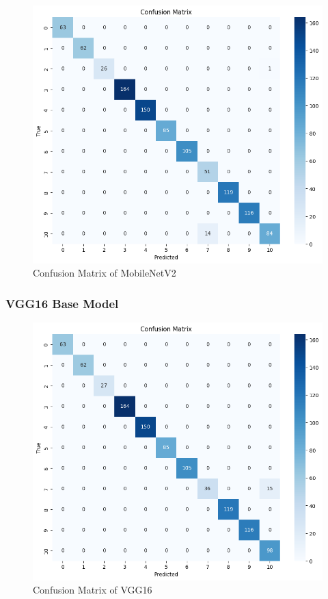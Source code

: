 \begin{figure}
    \centering
    \includegraphics[width=1\linewidth]{graphics//chapter6/cm mobilenetv2.png}
    \caption{Confusion Matrix of MobileNetV2}
    \label{fig:cm-mobnet}
\end{figure}


\subsubsection{VGG16 Base Model}

\begin{figure}
    \centering
    \includegraphics[width=1\linewidth]{graphics//chapter6/cm vgg16.png}
    \caption{Confusion Matrix of VGG16}
    \label{fig:cm-vgg16}
\end{figure}

